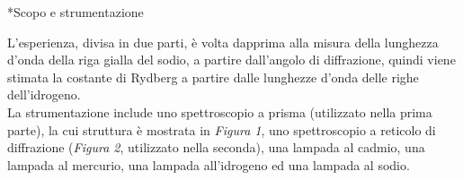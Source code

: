 \begin{section}*{Scopo e strumentazione}

L'esperienza, divisa in due parti, è volta dapprima alla misura della lunghezza d'onda della riga gialla del sodio, a partire dall'angolo di diffrazione, quindi viene stimata la costante di Rydberg a partire dalle lunghezze d'onda delle righe dell'idrogeno.\\ La strumentazione include uno spettroscopio a prisma (utilizzato nella prima parte), la cui struttura è mostrata in \emph{Figura 1}, uno spettroscopio a reticolo di diffrazione (\emph{Figura 2}, utilizzato nella seconda), una lampada al cadmio, una lampada al mercurio, una lampada all'idrogeno ed una lampada al sodio.


\end{section}

